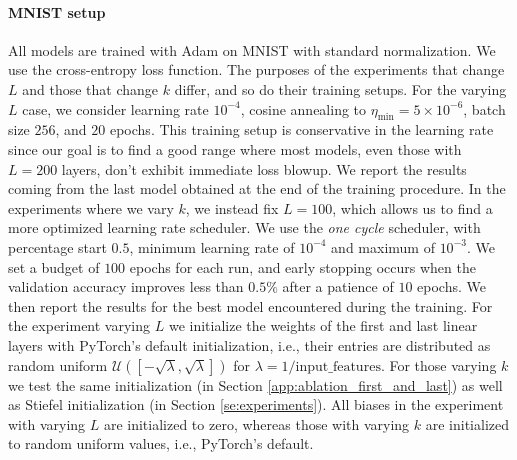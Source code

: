 \documentclass{article}
\theoremstyle{plain}
\theoremstyle{definition}
\theoremstyle{definition}
\theoremstyle{remark}
\theoremstyle{definition}
\theoremstyle{definition}
\theoremstyle{remark}
\numberwithin{equation}{section}
\begin{document}
\paragraph{MNIST setup}
All models are trained with Adam on MNIST with standard normalization. We use the cross-entropy loss function. The purposes of the experiments that change $L$ and those that change $k$ differ, and so do their training setups. For the varying $L$ case, we consider learning rate $10^{-4}$, cosine annealing to $\eta_{\min}=5\times 10^{-6}$, batch size $256$, and $20$ epochs. This training setup is conservative in the learning rate since our goal is to find a good range where most models, even those with $L=200$ layers, don't exhibit immediate loss blowup. We report the results coming from the last model obtained at the end of the training procedure. In the experiments where we vary $k$, we instead fix $L=100$, which allows us to find a more optimized learning rate scheduler. We use the \textit{one cycle} scheduler, with percentage start $0.5$, minimum learning rate of $10^{-4}$ and maximum of $10^{-3}$.  We set a budget of $100$ epochs for each run, and early stopping occurs when the validation accuracy improves less than $0.5\%$ after a patience of $10$ epochs. We then report the results for the best model encountered during the training. For the experiment varying $L$ we initialize the weights of the first and last linear layers with PyTorch's default initialization, i.e., their entries are distributed as random uniform $\mathcal{U}([-\sqrt{\lambda},\sqrt{\lambda}])$ for $\lambda = 1/\mathrm{input\_features}$. For those varying $k$ we test the same initialization (in Section \ref{app:ablation_first_and_last}) as well as Stiefel initialization (in Section \ref{se:experiments}). All biases in the experiment with varying $L$ are initialized to zero, whereas those with varying $k$ are initialized to random uniform values, i.e., PyTorch's default. %
\end{document}
